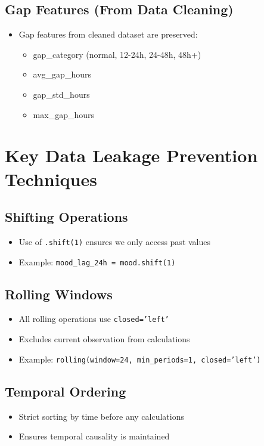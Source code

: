 \documentclass{article}
\begin{document}
\subsection{Gap Features (From Data Cleaning)}
\begin{itemize}[noitemsep]
\item Gap features from cleaned dataset are preserved:
  \begin{itemize}[noitemsep]
  \item gap\_category (normal, 12-24h, 24-48h, 48h+)
  \item avg\_gap\_hours
  \item gap\_std\_hours
  \item max\_gap\_hours
  \end{itemize}
\end{itemize}

\section{Key Data Leakage Prevention Techniques}

\subsection{Shifting Operations}
\begin{itemize}[noitemsep]
\item Use of \texttt{.shift(1)} ensures we only access past values
\item Example: \texttt{mood\_lag\_24h = mood.shift(1)}
\end{itemize}

\subsection{Rolling Windows}
\begin{itemize}[noitemsep]
\item All rolling operations use \texttt{closed='left'}
\item Excludes current observation from calculations
\item Example: \texttt{rolling(window=24, min\_periods=1, closed='left')}
\end{itemize}

\subsection{Temporal Ordering}
\begin{itemize}[noitemsep]
\item Strict sorting by time before any calculations
\item Ensures temporal causality is maintained
\end{itemize}
\end{document}
